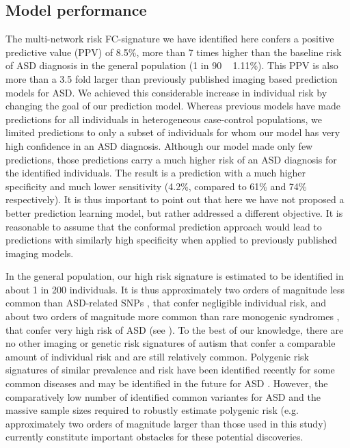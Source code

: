\documentclass[9pt,lineno]{elife}
\begin{document}
\subsection{Model performance}
The multi-network risk FC-signature we have identified here confers a positive predictive value (PPV) of 8.5\%, more than 7 times higher than the baseline risk of ASD diagnosis in the general population (1 in 90 ~ 1.11\%). This PPV is also more than a 3.5 fold larger than previously published imaging based prediction models for ASD. We achieved this considerable increase in individual risk by changing the goal of our prediction model. Whereas previous models have made predictions for all individuals in heterogeneous case-control populations, we limited predictions to only a subset of individuals for whom our model has very high confidence in an ASD diagnosis. Although our model made only few predictions, those predictions carry a much higher risk of an ASD diagnosis for the identified individuals. The result is a prediction with a much higher specificity \citep[99.5\% compared to 72.3\% and 63\% for traditional approaches,][]{Heinsfeld2018-yl,Abraham2017-vf} and much lower sensitivity (4.2\%, compared to 61\% and 74\% respectively). It is thus important to point out that here we have not proposed a better prediction learning model, but rather addressed a different objective. It is reasonable to assume that the conformal prediction approach would lead to predictions with similarly high specificity when applied to previously published imaging models.

In the general population, our high risk signature is estimated to be identified in about 1 in 200 individuals. It is thus approximately two orders of magnitude less common than ASD-related SNPs \citep{Grove2019-vz}, that confer negligible individual risk, and about two orders of magnitude more common than rare monogenic syndromes \citep{De_la_Torre-Ubieta2016-fw}, that confer very high risk of ASD (see ). To the best of our knowledge, there are no other imaging or genetic risk signatures of autism that confer a comparable amount of individual risk and are still relatively common. Polygenic risk signatures of similar prevalence and risk have been identified recently for some common diseases \citep{Khera2018-of} and may be identified in the future for ASD \citep{Martin2018-id}. However, the comparatively low number of identified common variantes for ASD \citep[i.e. only 5 ASD specific SNPs have been robustly identified to date, ][compared to 108 that have been identified for schizophrenia,  \citealt{Schizophrenia_Working_Group_of_the_Psychiatric_Genomics_Consortium2014-ld}]{Grove2019-vz}  and the massive sample sizes required to robustly estimate polygenic risk (e.g. approximately two orders of magnitude larger than those used in this study) currently constitute important obstacles for these potential discoveries. 
\end{document}
